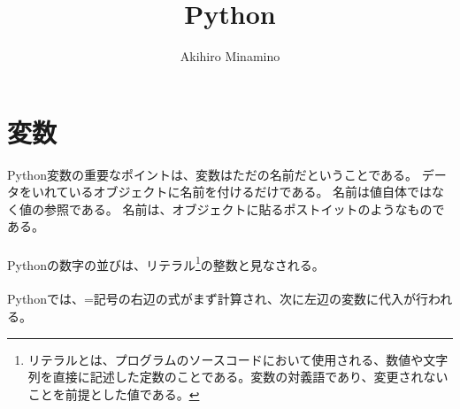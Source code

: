 \documentclass[11pt, oneside]{article}   	%
\title{Python}
\author{Akihiro Minamino}
\begin{document}
\maketitle
\section{変数}
Python変数の重要なポイントは、変数はただの名前だということである。
データをいれているオブジェクトに名前を付けるだけである。
名前は値自体ではなく値の参照である。
名前は、オブジェクトに貼るポストイットのようなものである。\\
　\\
Pythonの数字の並びは、リテラル\footnote{リテラルとは、プログラムのソースコードにおいて使用される、数値や文字列を直接に記述した定数のことである。変数の対義語であり、変更されないことを前提とした値である。}の整数と見なされる。\\
　\\
Pythonでは、=記号の右辺の式がまず計算され、次に左辺の変数に代入が行われる。
　\\
\end{document}
